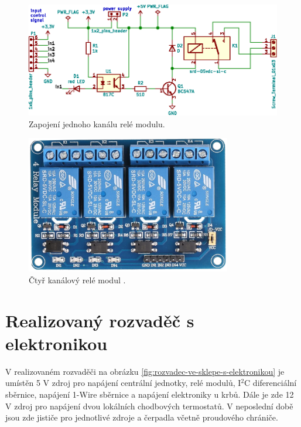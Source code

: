 \begin{figure}[H]
    \centering
    \includegraphics[width=\textwidth]{images/svg/kicad/rele-modul-jeden-kanal.eps}
    \caption[Zapojení jednoho kanálu relé modulu.]{Zapojení jednoho kanálu relé modulu.}
    \label{fig:rele-modul-jeden-kanal}
\end{figure}


\begin{figure}[H]
    \centering
    \includegraphics[width=0.8\textwidth]{images/ctyr-kanalovy-rele-modul.png}
    \caption[Čtyř kanálový relé modul.]{Čtyř kanálový relé modul \cite{ctyr-kanalovy-rele-modul}.}
    \label{fig:ctyr-kanalovy-rele-modul}
\end{figure}

\section{Realizovaný rozvaděč s elektronikou}

V realizovaném rozvaděči na obrázku \ref{fig:rozvadec-ve-sklepe-s-elektronikou} je umístěn 5 V zdroj pro napájení centrální jednotky, relé modulů, I$^2$C diferenciální sběrnice, napájení 1-Wire sběrnice a napájení elektroniky u krbů. Dále je zde 12 V zdroj pro napájení dvou lokálních chodbových termostatů. V  neposlední době jsou zde jističe pro jednotlivé zdroje a čerpadla včetně proudového chrániče.

